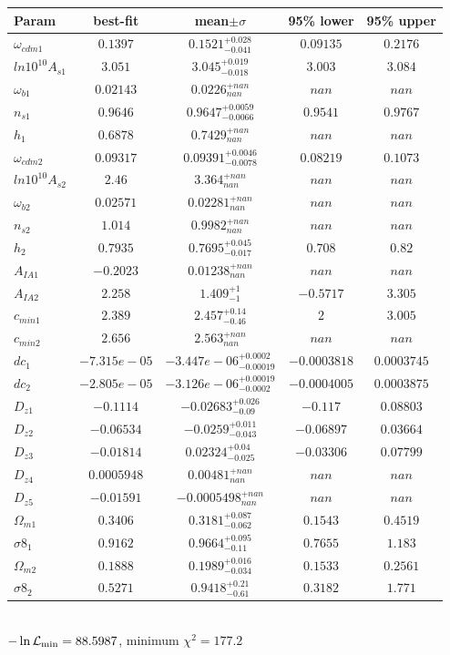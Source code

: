 \begin{tabular}{|l|c|c|c|c|} 
 \hline 
Param & best-fit & mean$\pm\sigma$ & 95\% lower & 95\% upper \\ \hline 
$\omega_{cdm 1 }$ &$0.1397$ & $0.1521_{-0.041}^{+0.028}$ & $0.09135$ & $0.2176$ \\ 
$ln10^{10}A_{s 1 }$ &$3.051$ & $3.045_{-0.018}^{+0.019}$ & $3.003$ & $3.084$ \\ 
$\omega_{b 1 }$ &$0.02143$ & $0.0226_{nan}^{+nan}$ & $nan$ & $nan$ \\ 
$n_{s 1 }$ &$0.9646$ & $0.9647_{-0.0066}^{+0.0059}$ & $0.9541$ & $0.9767$ \\ 
$h_{1 }$ &$0.6878$ & $0.7429_{nan}^{+nan}$ & $nan$ & $nan$ \\ 
$\omega_{cdm 2 }$ &$0.09317$ & $0.09391_{-0.0078}^{+0.0046}$ & $0.08219$ & $0.1073$ \\ 
$ln10^{10}A_{s 2 }$ &$2.46$ & $3.364_{nan}^{+nan}$ & $nan$ & $nan$ \\ 
$\omega_{b 2 }$ &$0.02571$ & $0.02281_{nan}^{+nan}$ & $nan$ & $nan$ \\ 
$n_{s 2 }$ &$1.014$ & $0.9982_{nan}^{+nan}$ & $nan$ & $nan$ \\ 
$h_{2 }$ &$0.7935$ & $0.7695_{-0.017}^{+0.045}$ & $0.708$ & $0.82$ \\ 
$A_{IA 1 }$ &$-0.2023$ & $0.01238_{nan}^{+nan}$ & $nan$ & $nan$ \\ 
$A_{IA 2 }$ &$2.258$ & $1.409_{-1}^{+1}$ & $-0.5717$ & $3.305$ \\ 
$c_{min 1 }$ &$2.389$ & $2.457_{-0.46}^{+0.14}$ & $2$ & $3.005$ \\ 
$c_{min 2 }$ &$2.656$ & $2.563_{nan}^{+nan}$ & $nan$ & $nan$ \\ 
$dc_{1 }$ &$-7.315e-05$ & $-3.447e-06_{-0.00019}^{+0.0002}$ & $-0.0003818$ & $0.0003745$ \\ 
$dc_{2 }$ &$-2.805e-05$ & $-3.126e-06_{-0.0002}^{+0.00019}$ & $-0.0004005$ & $0.0003875$ \\ 
$D_{z1 }$ &$-0.1114$ & $-0.02683_{-0.09}^{+0.026}$ & $-0.117$ & $0.08803$ \\ 
$D_{z2 }$ &$-0.06534$ & $-0.0259_{-0.043}^{+0.011}$ & $-0.06897$ & $0.03664$ \\ 
$D_{z3 }$ &$-0.01814$ & $0.02324_{-0.025}^{+0.04}$ & $-0.03306$ & $0.07799$ \\ 
$D_{z4 }$ &$0.0005948$ & $0.00481_{nan}^{+nan}$ & $nan$ & $nan$ \\ 
$D_{z5 }$ &$-0.01591$ & $-0.0005498_{nan}^{+nan}$ & $nan$ & $nan$ \\ 
$\Omega_{m 1 }$ &$0.3406$ & $0.3181_{-0.062}^{+0.087}$ & $0.1543$ & $0.4519$ \\ 
$\sigma8_{1 }$ &$0.9162$ & $0.9664_{-0.11}^{+0.095}$ & $0.7655$ & $1.183$ \\ 
$\Omega_{m 2 }$ &$0.1888$ & $0.1989_{-0.034}^{+0.016}$ & $0.1533$ & $0.2561$ \\ 
$\sigma8_{2 }$ &$0.5271$ & $0.9418_{-0.61}^{+0.21}$ & $0.3182$ & $1.771$ \\ 
\hline 
 \end{tabular} \\ 
$-\ln{\cal L}_\mathrm{min} =88.5987$, minimum $\chi^2=177.2$ \\ 
